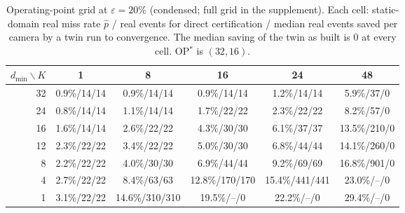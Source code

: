 \begin{table}[t]
\centering
\caption{Operating-point grid at $\varepsilon=20\%$ (condensed; full grid in the supplement). Each cell: static-domain real miss rate $\hat p$ / real events for direct certification / median real events saved per camera by a twin run to convergence. The median saving of the twin as built is 0 at every cell. OP$^\ast$ is $(32,16)$.}
\label{tab:grid}
\scriptsize
\setlength{\tabcolsep}{3pt}
\begin{tabular}{@{}rccccc@{}}
\toprule
$d_{\min}\backslash K$ & 1 & 8 & 16 & 24 & 48 \\
\midrule
32 & 0.9\%/14/14 & 0.9\%/14/14 & 0.9\%/14/14 & 1.2\%/14/14 & 5.9\%/37/0 \\
24 & 0.8\%/14/14 & 1.1\%/14/14 & 1.7\%/22/22 & 2.3\%/22/22 & 8.2\%/57/0 \\
16 & 1.6\%/14/14 & 2.6\%/22/22 & 4.3\%/30/30 & 6.1\%/37/37 & 13.5\%/210/0 \\
12 & 2.3\%/22/22 & 3.4\%/22/22 & 5.0\%/30/30 & 6.8\%/44/44 & 14.1\%/260/0 \\
8 & 2.2\%/22/22 & 4.0\%/30/30 & 6.9\%/44/44 & 9.2\%/69/69 & 16.8\%/901/0 \\
4 & 2.7\%/22/22 & 8.4\%/63/63 & 12.8\%/170/170 & 15.4\%/441/441 & 23.0\%/--/0 \\
1 & 3.1\%/22/22 & 14.6\%/310/310 & 19.5\%/--/0 & 22.2\%/--/0 & 29.4\%/--/0 \\
\bottomrule
\end{tabular}
\end{table}
